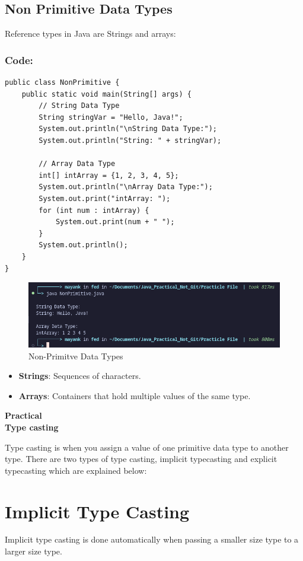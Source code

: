 \documentclass[a4paper,12pt]{article}
\newcounter{practicalno} %
\newcommand{\practicaltitle}[1]{
    \stepcounter{practicalno} %
    \newpage
    \begin{center}
        \vspace{1cm}
        \Large\textbf{Practical \thepracticalno} \\
        \vspace{0.5cm}
        \Large\textbf{#1} %
        \normalsize\vspace{1cm}
    \end{center}
}
\begin{document}
\subsection{Non Primitive Data Types}
Reference types in Java are Strings and arrays:
\subsubsection{Code: }
\begin{lstlisting}
public class NonPrimitive {
    public static void main(String[] args) {
        // String Data Type
        String stringVar = "Hello, Java!";
        System.out.println("\nString Data Type:");
        System.out.println("String: " + stringVar);

        // Array Data Type
        int[] intArray = {1, 2, 3, 4, 5};
        System.out.println("\nArray Data Type:");
        System.out.print("intArray: ");
        for (int num : intArray) {
            System.out.print(num + " ");
        }
        System.out.println();
    }
}  
\end{lstlisting}

\begin{figure}[H]
    \centering
    \includegraphics[width=0.9\linewidth]{images/NonPrimData.png}
    \caption{Non-Primitve Data Types}
    \label{fig:sample_image}
\end{figure}

\begin{itemize}[leftmargin=2cm]
    \item \textbf{Strings}: Sequences of characters.
    \item \textbf{Arrays}: Containers that hold multiple values of the same type.
\end{itemize}

\setcounter{section}{0}

\practicaltitle{Type casting}
Type casting is when you assign a value of one primitive data type to another type. There are two types of type casting, implicit typecasting and explicit typecasting which are explained below:

\section{Implicit Type Casting}
Implicit type casting is done automatically when passing a smaller size type to a larger size type.
\begin{center}
\end{center}
\end{document}
